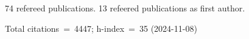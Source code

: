 74 refereed publications. 13 refeered publications as first author.

Total citations~=~4447; h-index~=~35 (2024-11-08)